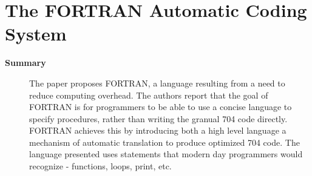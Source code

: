 \section {The FORTRAN Automatic Coding System \cite{backus1957fortran}}

\begin{description}
    \item[\textbf{Summary}]
        The paper proposes FORTRAN, a language resulting from a need to reduce computing overhead.
        The authors report that the goal of FORTRAN is for programmers to be able to use a concise language to specify procedures, rather than writing the granual 704 code directly.
        FORTRAN achieves this by introducing both a high level language a mechanism of automatic translation to produce optimized 704 code.
        The language presented uses statements that modern day programmers would recognize - functions, loops, print, etc.


\end{description}
